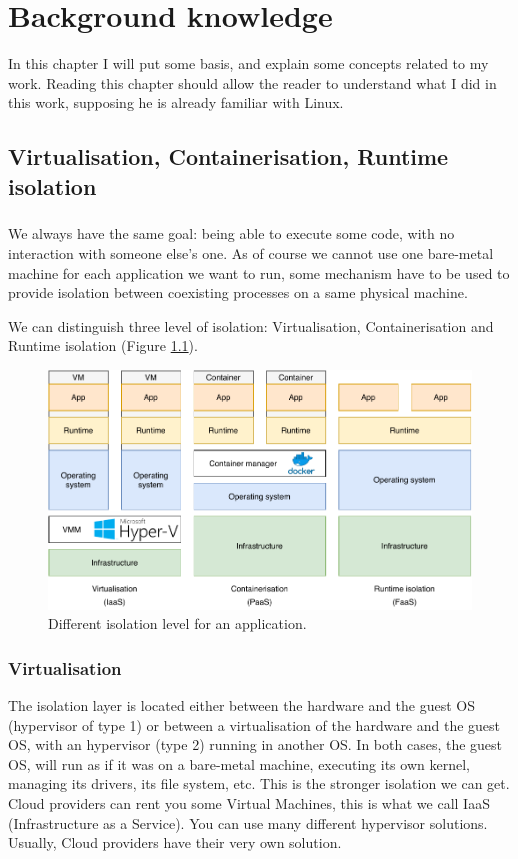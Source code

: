\chapter{Background knowledge}

In this chapter I will put some basis, and explain some concepts related to my work.  Reading this chapter should allow the reader to understand what I did in this work, supposing he is already familiar with Linux.

\section{Virtualisation, Containerisation, Runtime isolation}
\paragraph{}We always have the same goal: being able to execute some code, with no interaction with someone else's one.  As of course we cannot use one bare-metal machine for each application we want to run, some mechanism have to be used to provide isolation between coexisting processes on a same physical machine.

We can distinguish three level of isolation: Virtualisation, Containerisation and Runtime isolation (Figure \ref{fig:virt-cont-runt}).
\begin{figure}
  \begin{center}
    \includegraphics[width=\linewidth]{images/Virt-Cont-Runt.pdf}
    \caption{Different isolation level for an application.}
    \label{fig:virt-cont-runt}
  \end{center}
\end{figure}
\subsection{Virtualisation}
The isolation layer is located either between the hardware and the guest OS (hypervisor of type 1) or between a virtualisation of the hardware and the guest OS, with an hypervisor (type 2) running in another OS.  In both cases, the guest OS, will run as if it was on a bare-metal machine, executing its own kernel, managing its drivers, its file system, etc.  This is the stronger isolation we can get.  Cloud providers can rent you some Virtual Machines, this is what we call IaaS (Infrastructure as a Service).  You can use many different hypervisor solutions. Usually, Cloud providers have their very own solution.
